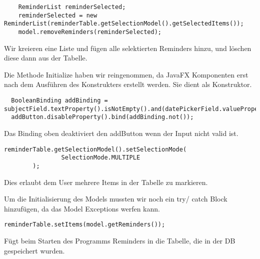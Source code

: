 \begin{lstlisting}
    ReminderList reminderSelected;
    reminderSelected = new ReminderList(reminderTable.getSelectionModel().getSelectedItems());
    model.removeReminders(reminderSelected);
\end{lstlisting}

Wir kreieren eine Liste und fügen alle selektierten Reminders hinzu, und löschen diese dann aus der Tabelle.


Die Methode Initialize haben wir reingenommen, da JavaFX Komponenten erst nach dem Ausführen des Konstrukters erstellt werden. Sie dient als Konstruktor.
\begin{lstlisting}
  BooleanBinding addBinding = subjectField.textProperty().isNotEmpty().and(datePickerField.valueProperty().isNotNull());
  addButton.disableProperty().bind(addBinding.not());
\end{lstlisting}
Das Binding oben deaktiviert den addButton wenn der Input nicht valid ist.

\begin{lstlisting}
reminderTable.getSelectionModel().setSelectionMode(
                SelectionMode.MULTIPLE
        );
\end{lstlisting}
Dies erlaubt dem User mehrere Items in der Tabelle zu markieren.

Um die Initialisierung des Models mussten wir noch ein try/ catch Block hinzufügen, da das Model Exceptions werfen kann.

\begin{lstlisting}
reminderTable.setItems(model.getReminders());
\end{lstlisting}
Fügt beim Starten des Programms Reminders in die Tabelle, die in der DB gespeichert wurden.

